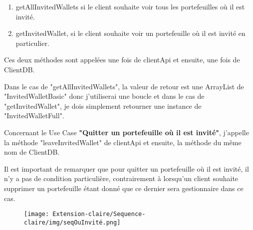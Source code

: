 \begin{enumerate}
\item getAllInvitedWallets si le client souhaite voir tous les portefeuilles où il est invité.
\item getInvitedWallet, si le client souhaite voir un portefeuille où il est invité en particulier.
\end{enumerate}

\begin{flushleft}
Ces deux méthodes sont appelées une fois de clientApi et ensuite, une fois de ClientDB.
\end{flushleft}

\begin{flushleft}
Dans le cas de "getAllInvitedWallets", la valeur de retour est une ArrayList de "InvitedWalletBasic" donc j'utiliserai une boucle et dans le cas de "getInvitedWallet", je dois simplement retourner une instance de "InvitedWalletFull".
\end{flushleft}

\begin{flushleft}
Concernant le Use Case \textbf{"Quitter un portefeuille où il est invité"}, j'appelle la méthode "leaveInvitedWallet" de clientApi et ensuite, la méthode du même nom de ClientDB.
\end{flushleft}

\begin{flushleft}
Il est important de remarquer que pour quitter un portefeuille où il est invité, il n'y a pas de condition particulière, contrairement à lorsqu'un client souhaite supprimer un portefeuille étant donné que ce dernier sera gestionnaire dans ce cas.
\end{flushleft}

\newpage
\begin{figure}[h]
\centering
\texttt{[image: Extension-claire/Sequence-claire/img/seqOuInvité.png]}
\end{figure}

\newpage

